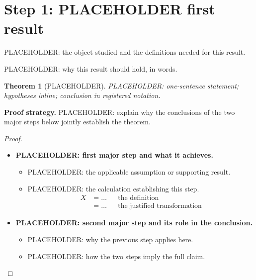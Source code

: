 \documentclass[12pt]{article}
\newtheorem{theorem}{Theorem}
\theoremstyle{remark}
\begin{document}
\section{Step 1: PLACEHOLDER first result}

PLACEHOLDER: the object studied and the definitions needed for this result.

PLACEHOLDER: why this result should hold, in words.

\begin{theorem}[PLACEHOLDER]\label{thm:one}
PLACEHOLDER: one-sentence statement; hypotheses inline; conclusion in
registered notation.
\end{theorem}

\textbf{Proof strategy.} PLACEHOLDER: explain why the conclusions of the two
major steps below jointly establish the theorem.

\begin{proof}
\leavevmode\par
\begin{itemize}
  \item \textbf{PLACEHOLDER: first major step and what it achieves.}
    \begin{itemize}
      \item PLACEHOLDER: the applicable assumption or supporting result.
      \item PLACEHOLDER: the calculation establishing this step.
        \begin{align*}
        X &= \dots && \text{the definition}\\
          &= \dots && \text{the justified transformation}
        \end{align*}
    \end{itemize}
  \item \textbf{PLACEHOLDER: second major step and its role in the conclusion.}
    \begin{itemize}
      \item PLACEHOLDER: why the previous step applies here.
      \item PLACEHOLDER: how the two steps imply the full claim. \qedhere
    \end{itemize}
\end{itemize}
\end{proof}
\end{document}
